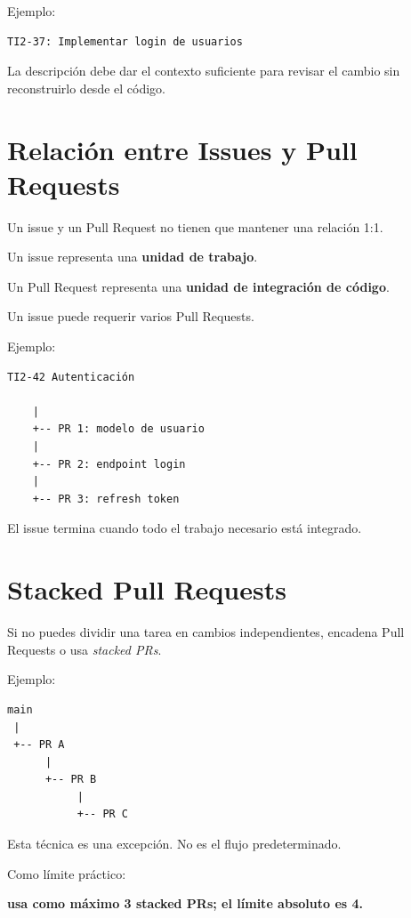 \documentclass[11pt,a4paper]{article}
\begin{document}
Ejemplo:

\begin{lstlisting}
TI2-37: Implementar login de usuarios
\end{lstlisting}

La descripción debe dar el contexto suficiente para revisar el cambio sin
reconstruirlo desde el código.


\section{Relación entre Issues y Pull Requests}

Un issue y un Pull Request no tienen que mantener una relación 1:1.

Un issue representa una \textbf{unidad de trabajo}.

Un Pull Request representa una \textbf{unidad de integración de código}.

Un issue puede requerir varios Pull Requests.

Ejemplo:

\begin{lstlisting}
TI2-42 Autenticación

    |
    +-- PR 1: modelo de usuario
    |
    +-- PR 2: endpoint login
    |
    +-- PR 3: refresh token
\end{lstlisting}

El issue termina cuando todo el trabajo necesario está integrado.


\section{Stacked Pull Requests}

Si no puedes dividir una tarea en cambios independientes, encadena Pull
Requests o usa \textit{stacked PRs}.

Ejemplo:

\begin{lstlisting}
main
 |
 +-- PR A
      |
      +-- PR B
           |
           +-- PR C
\end{lstlisting}

Esta técnica es una excepción. No es el flujo predeterminado.

Como límite práctico:

\begin{center}
  \textbf{usa como máximo 3 stacked PRs; el límite absoluto es 4.}
\end{center}
\end{document}
